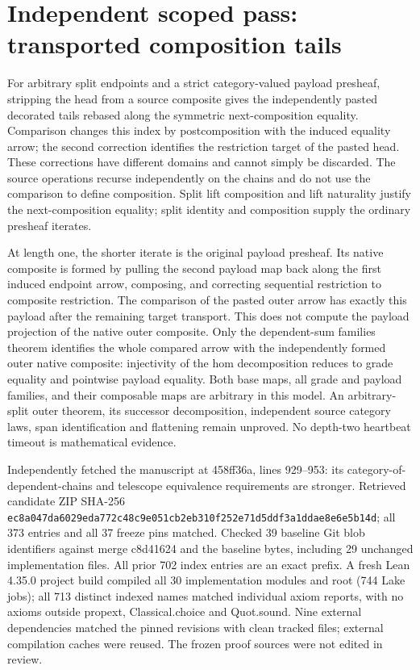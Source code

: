 \documentclass{article}
\begin{document}
\section*{Independent scoped pass: transported composition tails}
For arbitrary split endpoints and a strict category-valued payload presheaf, stripping the head from a source composite gives the independently pasted decorated tails rebased along the symmetric next-composition equality. Comparison changes this index by postcomposition with the induced equality arrow; the second correction identifies the restriction target of the pasted head. These corrections have different domains and cannot simply be discarded. The source operations recurse independently on the chains and do not use the comparison to define composition. Split lift composition and lift naturality justify the next-composition equality; split identity and composition supply the ordinary presheaf iterates.
\par At length one, the shorter iterate is the original payload presheaf. Its native composite is formed by pulling the second payload map back along the first induced endpoint arrow, composing, and correcting sequential restriction to composite restriction. The comparison of the pasted outer arrow has exactly this payload after the remaining target transport. This does not compute the payload projection of the native outer composite. Only the dependent-sum families theorem identifies the whole compared arrow with the independently formed outer native composite: injectivity of the hom decomposition reduces to grade equality and pointwise payload equality. Both base maps, all grade and payload families, and their composable maps are arbitrary in this model. An arbitrary-split outer theorem, its successor decomposition, independent source category laws, span identification and flattening remain unproved. No depth-two heartbeat timeout is mathematical evidence.
\par Independently fetched the manuscript at 458ff36a, lines 929--953: its category-of-dependent-chains and telescope equivalence requirements are stronger. Retrieved candidate ZIP SHA-256 \texttt{ec8a047da6029eda772c48c9e051cb2eb310f252e71d5ddf3a1ddae8e6e5b14d}; all 373 entries and all 37 freeze pins matched. Checked 39 baseline Git blob identifiers against merge c8d41624 and the baseline bytes, including 29 unchanged implementation files. All prior 702 index entries are an exact prefix. A fresh Lean 4.35.0 project build compiled all 30 implementation modules and root (744 Lake jobs); all 713 distinct indexed names matched individual axiom reports, with no axioms outside propext, Classical.choice and Quot.sound. Nine external dependencies matched the pinned revisions with clean tracked files; external compilation caches were reused. The frozen proof sources were not edited in review.
\end{document}
